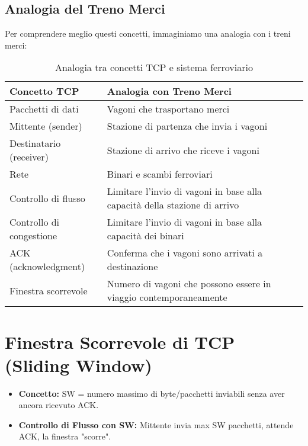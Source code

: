 \subsection{Analogia del Treno Merci}
Per comprendere meglio questi concetti, immaginiamo una analogia con i treni merci:

\begin{table}[H]
    \centering
    \begin{tabular}{|p{4cm}|p{10cm}|}
        \hline
        \rowcolor{bg_custom}
        \textbf{Concetto TCP} & \textbf{Analogia con Treno Merci} \\
        \hline
        Pacchetti di dati & Vagoni che trasportano merci \\
        \hline
        Mittente (sender) & Stazione di partenza che invia i vagoni \\
        \hline
        Destinatario (receiver) & Stazione di arrivo che riceve i vagoni \\
        \hline
        Rete & Binari e scambi ferroviari \\
        \hline
        Controllo di flusso & Limitare l'invio di vagoni in base alla capacità della stazione di arrivo \\
        \hline
        Controllo di congestione & Limitare l'invio di vagoni in base alla capacità dei binari \\
        \hline
        ACK (acknowledgment) & Conferma che i vagoni sono arrivati a destinazione \\
        \hline
        Finestra scorrevole & Numero di vagoni che possono essere in viaggio contemporaneamente \\
        \hline
    \end{tabular}
    \caption{Analogia tra concetti TCP e sistema ferroviario}
\end{table}

\section{Finestra Scorrevole di TCP (Sliding Window)}
\begin{itemize}
    \item \textbf{Concetto:} SW = numero massimo di byte/pacchetti inviabili senza aver ancora ricevuto ACK.
    \item \textbf{Controllo di Flusso con SW:} Mittente invia max SW pacchetti, attende ACK, la finestra "scorre".
\end{itemize}


